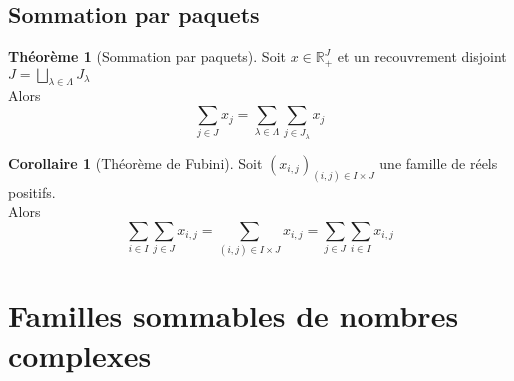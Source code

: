 \documentclass[10pt,a4paper]{article}
\theoremstyle{definition}
\newtheorem{theorem}[proposition]{Théorème}
\newtheorem{corollaire}[proposition]{Corollaire}
\begin{document}
\subsection{Sommation par paquets}
\begin{theorem}[Sommation par paquets]
Soit $x \in \mathbb{R}_+^J$ et un recouvrement disjoint $J = \bigsqcup\limits_{\lambda \in \Lambda} J_\lambda$ \\
Alors
\[\sum\limits_{j \in J} x_j = \sum\limits_{\lambda \in \Lambda} \sum\limits_{j \in J_\lambda} x_j\]
\end{theorem}
\begin{corollaire}[Théorème de Fubini]
Soit $(x_{i, j})_{(i, j) \in I \times J}$ une famille de réels positifs. \\
Alors
\[ \sum\limits_{i \in I} \sum\limits_{j \in J} x_{i, j} = \sum\limits_{(i, j) \in I \times J} x_{i, j} = \sum\limits_{j \in J} \sum\limits_{i \in I} x_{i, j}\]
\end{corollaire}

\pagebreak

\section{Familles sommables de nombres complexes}
\end{document}
